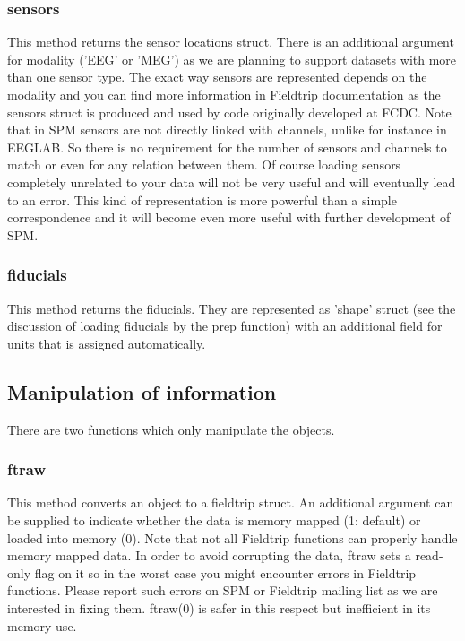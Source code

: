 \subsubsection{sensors}
This method returns the sensor locations struct. There is an additional argument
for modality ('EEG' or 'MEG') as we are planning to support datasets with more
than one sensor type. The exact way sensors are represented depends on the modality
and you can find more information in Fieldtrip documentation as the sensors struct is
produced and used by code originally developed at FCDC. Note that in SPM sensors are not 
directly linked with channels, unlike for instance in EEGLAB. So there is no requirement
for the number of sensors and channels to match or even for any relation between them.
Of course loading sensors completely unrelated to your data will not be very useful and will
eventually lead to an error. This kind of representation is more powerful than a
simple correspondence and it will become even more useful with further development of SPM. 


\subsubsection{fiducials}
This method returns the fiducials. They are represented as 'shape' struct (see the
discussion of loading fiducials by the prep function) with an additional field for
units that is assigned automatically. 

\subsection{Manipulation of information}
There are two functions which only manipulate the objects. 

\subsubsection{ftraw}
This method converts an object to a fieldtrip struct. An additional
argument can be supplied to indicate whether the data is memory mapped
(1: default) or loaded into memory (0). Note that not all Fieldtrip functions
can properly handle memory mapped data. In order to avoid corrupting
the data, ftraw sets a read-only flag on it so in the worst case you might
encounter errors in Fieldtrip functions. Please report such errors on
SPM or Fieldtrip mailing list as we are interested in fixing them. ftraw(0) is 
safer in this respect but inefficient in its memory use. 

